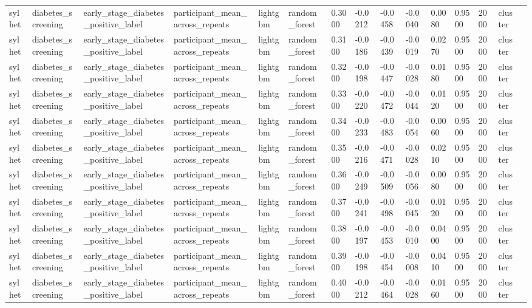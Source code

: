 \begin{tabular}{lllllllllllllll}
sylhet & diabetes\_screening & early\_stage\_diabetes\_positive\_label & participant\_mean\_across\_repeats & lightgbm & random\_forest & 0.3000 & -0.0212 & -0.0458 & -0.0040 & 0.0080 & 0.9500 & 2000 & cluster &  \\
sylhet & diabetes\_screening & early\_stage\_diabetes\_positive\_label & participant\_mean\_across\_repeats & lightgbm & random\_forest & 0.3100 & -0.0186 & -0.0439 & -0.0019 & 0.0270 & 0.9500 & 2000 & cluster &  \\
sylhet & diabetes\_screening & early\_stage\_diabetes\_positive\_label & participant\_mean\_across\_repeats & lightgbm & random\_forest & 0.3200 & -0.0198 & -0.0447 & -0.0028 & 0.0180 & 0.9500 & 2000 & cluster &  \\
sylhet & diabetes\_screening & early\_stage\_diabetes\_positive\_label & participant\_mean\_across\_repeats & lightgbm & random\_forest & 0.3300 & -0.0220 & -0.0472 & -0.0044 & 0.0120 & 0.9500 & 2000 & cluster &  \\
sylhet & diabetes\_screening & early\_stage\_diabetes\_positive\_label & participant\_mean\_across\_repeats & lightgbm & random\_forest & 0.3400 & -0.0233 & -0.0483 & -0.0054 & 0.0060 & 0.9500 & 2000 & cluster &  \\
sylhet & diabetes\_screening & early\_stage\_diabetes\_positive\_label & participant\_mean\_across\_repeats & lightgbm & random\_forest & 0.3500 & -0.0216 & -0.0471 & -0.0028 & 0.0210 & 0.9500 & 2000 & cluster &  \\
sylhet & diabetes\_screening & early\_stage\_diabetes\_positive\_label & participant\_mean\_across\_repeats & lightgbm & random\_forest & 0.3600 & -0.0249 & -0.0509 & -0.0056 & 0.0080 & 0.9500 & 2000 & cluster &  \\
sylhet & diabetes\_screening & early\_stage\_diabetes\_positive\_label & participant\_mean\_across\_repeats & lightgbm & random\_forest & 0.3700 & -0.0241 & -0.0498 & -0.0045 & 0.0120 & 0.9500 & 2000 & cluster &  \\
sylhet & diabetes\_screening & early\_stage\_diabetes\_positive\_label & participant\_mean\_across\_repeats & lightgbm & random\_forest & 0.3800 & -0.0197 & -0.0453 & -0.0010 & 0.0400 & 0.9500 & 2000 & cluster &  \\
sylhet & diabetes\_screening & early\_stage\_diabetes\_positive\_label & participant\_mean\_across\_repeats & lightgbm & random\_forest & 0.3900 & -0.0198 & -0.0454 & -0.0008 & 0.0410 & 0.9500 & 2000 & cluster &  \\
sylhet & diabetes\_screening & early\_stage\_diabetes\_positive\_label & participant\_mean\_across\_repeats & lightgbm & random\_forest & 0.4000 & -0.0212 & -0.0464 & -0.0028 & 0.0160 & 0.9500 & 2000 & cluster &  \\

\end{tabular}
